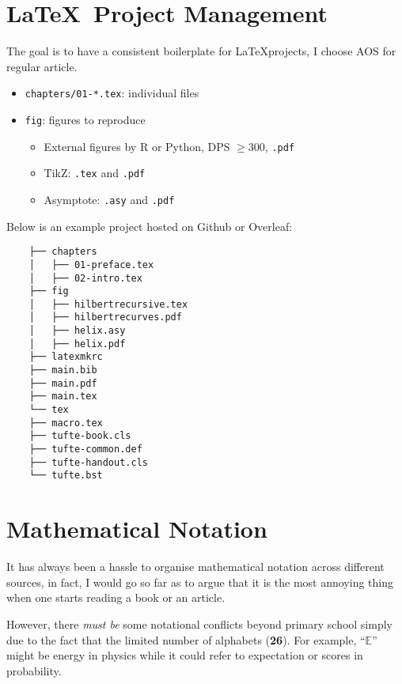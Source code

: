 \newpage


\section{\LaTeX\ Project Management}

The goal is to have a consistent boilerplate for \LaTeX projects,
I choose AOS for regular article.

\begin{itemize}
    \item \verb|chapters/01-*.tex|: individual files
    \item \verb|fig|: figures to reproduce
          \begin{itemize}
              \item External figures by \textsf{R} or Python, DPS $\geq 300$, \texttt{.pdf}
              \item TikZ: \texttt{.tex} and \texttt{.pdf}
              \item Asymptote: \texttt{.asy} and \texttt{.pdf}
          \end{itemize}
\end{itemize}

Below is an example project hosted on Github or Overleaf:

\begin{Verbatim}
    ├── chapters
    │   ├── 01-preface.tex
    │   ├── 02-intro.tex
    ├── fig
    │   ├── hilbertrecursive.tex
    │   ├── hilbertrecurves.pdf
    │   ├── helix.asy
    │   ├── helix.pdf
    ├── latexmkrc
    ├── main.bib
    ├── main.pdf
    ├── main.tex
    └── tex
    ├── macro.tex
    ├── tufte-book.cls
    ├── tufte-common.def
    ├── tufte-handout.cls
    └── tufte.bst
\end{Verbatim}

\section{Mathematical Notation}

It has always been a hassle to organise mathematical notation across different sources,
in fact, I would go so far as to argue that it is the most annoying thing
when one starts reading a book or an article.

However, there \textit{must be} some notational conflicts beyond primary school
simply due to the fact that the limited number of alphabets (\textbf{26}).
For example, ``$\mathbb{E}$'' might be energy in physics
while it could refer to expectation or scores in probability.


